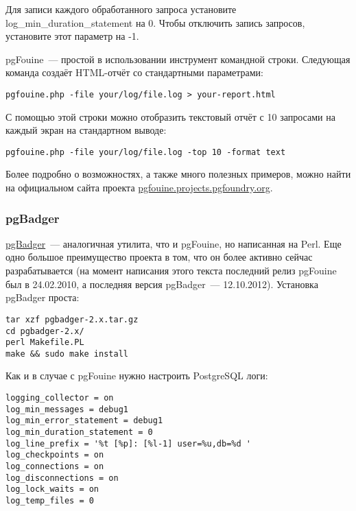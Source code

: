 Для записи каждого обработанного запроса установите log\_min\_duration\_statement на 0. Чтобы отключить запись запросов, установите этот параметр на -1.

pgFouine~--- простой в использовании инструмент командной строки. Следующая команда создаёт HTML-отчёт со стандартными параметрами:

\begin{lstlisting}[label=lst:sql_performance7,caption=pgFouine]
pgfouine.php -file your/log/file.log > your-report.html
\end{lstlisting}

С помощью этой строки можно отобразить текстовый отчёт с 10 запросами на каждый экран на стандартном выводе:

\begin{lstlisting}[label=lst:sql_performance8,caption=pgFouine]
pgfouine.php -file your/log/file.log -top 10 -format text
\end{lstlisting}

Более подробно о возможностях, а также много полезных примеров, можно найти на официальном сайта проекта \href{http://pgfouine.projects.pgfoundry.org/}{pgfouine.projects.pgfoundry.org}.

\subsubsection{pgBadger}

\href{http://dalibo.github.com/pgbadger/}{pgBadger}~--- аналогичная утилита, что и pgFouine, но написанная на Perl. Еще одно большое преимущество проекта в том, что он более активно сейчас разрабатывается (на момент написания этого текста последний релиз pgFouine был в 24.02.2010, а последняя версия pgBadger~--- 12.10.2012). Установка pgBadger проста:

\begin{lstlisting}[label=lst:sql_performance9,caption=Установка pgBadger]
tar xzf pgbadger-2.x.tar.gz
cd pgbadger-2.x/
perl Makefile.PL
make && sudo make install
\end{lstlisting}

Как и в случае с pgFouine нужно настроить PostgreSQL логи:

\begin{lstlisting}[label=lst:sql_performance10,caption=Настройка логов PostgreSQL]
logging_collector = on
log_min_messages = debug1
log_min_error_statement = debug1
log_min_duration_statement = 0
log_line_prefix = '%t [%p]: [%l-1] user=%u,db=%d '
log_checkpoints = on
log_connections = on
log_disconnections = on
log_lock_waits = on
log_temp_files = 0
\end{lstlisting}

